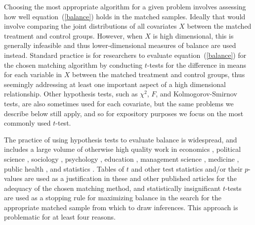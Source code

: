 \documentclass[11pt,titlepage]{article}
\begin{document}
Choosing the most appropriate algorithm for a given problem involves
assessing how well equation~(\ref{balance}) holds in the matched
samples.  Ideally that would involve comparing the joint distributions
of all covariates $X$ between the matched treatment and control
groups.  However, when $X$ is high dimensional, this is generally
infeasible and thus lower-dimensional measures of balance are used
instead.  Standard practice is for researchers to evaluate
equation~(\ref{balance}) for the chosen matching algorithm by
conducting $t$-tests for the difference in means for each variable in
$X$ between the matched treatment and control groups, thus seemingly
addressing at least one important aspect of a high dimensional
relationship.  Other hypothesis tests, such as $\chi^2$, $F$, and
Kolmogorov-Smirnov tests, are also sometimes used for each covariate,
but the same problems we describe below still apply, and so for
expository purposes we focus on the most commonly used $t$-test.

The practice of using hypothesis tests to evaluate balance is
widespread, and includes a large volume of otherwise high quality work
in economics \citep{LisMilFre03,BlaSmi04,AgoDyn04,DehWah99,
  DehWah02,SmiTod05}, political science \citep{Imai05,SimHop05},
sociology \citep{LunSmi05}, psychology
\citep{HavNag05,HilWalBro05,YosMagBos03,JonDAgGon04,McCRidMor04},
education \citep{Crosnoe05,SchBuc03}, management science
\citep{FreMil04, Villalonga04,WanSchAvo05}, medicine
\citep{WanSchAvo05, MacRivJur06,LinPekWan05,ManTudDie06, PetRoeMul06,
  ShiLitPot06,SabCanGib05,PerTuUnd00,AusMam06,AusMamStu05}, public
health \citep{NovReaRau06,ElBGilWu05,LauSmiSta00,BinBreEar05}, and
statistics \citep{LuZanHor01}.  Tables of $t$ and other test
statistics and/or their $p$-values are used as a justification in
these and other published articles for the adequacy of the chosen
matching method, and statistically insignificant $t$-tests are used as
a stopping rule for maximizing balance in the search for the
appropriate matched sample from which to draw inferences.  This
approach is problematic for at least four reasons.
\end{document}
